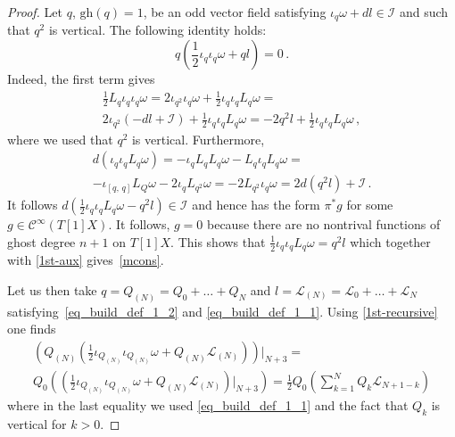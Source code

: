 \documentclass[10pt,a4paper]{amsart}
\def\cI{\mathcal{I}}
\def\cL{\mathcal{L}}
\newcommand{\cC}{\mathcal{C}}
\newcommand{\commut}[2]{[#1{,}\,#2]}
\newcommand{\gh}[1]{\mathrm{gh}(#1)}
\newcommand{\hhalf}{\frac{1}{2}}
\newcommand{\h}{\cL}
\begin{document}
\begin{proof}
Let $q$, $\gh{q}=1$, be an odd vector field satisfying $\iota_q \omega+d l\in\cI$ and such that $q^2$ is vertical. The following identity holds:
\begin{equation}
\label{mcons}
q(\hhalf \iota_q\iota_q\omega+ql)=0\,.
\end{equation}
Indeed, the first term gives
\begin{multline}
\label{1st-aux}
\hhalf L_q \iota_q\iota_q \omega=2\iota_{q^2}\iota_q\omega+\hhalf \iota_q\iota_q  L_q  \omega= \\
2\iota_{q^2}(-dl+\cI)+\hhalf \iota_q\iota_q  L_q  \omega= -2q^2l +\hhalf \iota_q\iota_q  L_q  \omega\,,
\end{multline}
where we used that $q^2$ is vertical. Furthermore,
\begin{multline}
d(\iota_q\iota_qL_q\omega)=
-\iota_qL_qL_q\omega-L_q\iota_qL_q\omega=
\\
-\iota_{\commut{q}{q}}L_Q\omega-2\iota_qL_{q^2}\omega=-2 L_{q^2}\iota_q \omega =
2d (q^2 l)+\cI \,.
\end{multline}
It follows $d(\hhalf \iota_q\iota_qL_q\omega-q^2l)\in \cI$ and hence has the form $\pi^*g$ for some $g\in \cC^\infty(T[1]X)$. It follows, $g=0$ because  there are no nontrival functions of ghost degree $n+1$ on $T[1]X$. This shows that $\hhalf \iota_q\iota_qL_q\omega=q^2l$ which together with \eqref{1st-aux} gives~\eqref{mcons}.


Let us then take $q=Q_{(N)}=Q_0+\ldots+Q_N$ and
$l=\cL_{(N)}=\cL_0+\ldots+\cL_N$ satisfying~\eqref{eq_build_def_1_2} and \eqref{eq_build_def_1_1}. Using \eqref{1st-recursive} one finds
\begin{multline}
\left(Q_{(N)}\left(\frac{1}{2}\iota_{Q_{(N)}}\iota_{Q_{(N)}} \omega +Q_{(N)}\cL_{(N)}\right)\right)\Big|_{N+3}=\\
Q_0\left(\left(\frac{1}{2}\iota_{Q_{(N)}}\iota_{Q_{(N)}} \omega+Q_{(N)}\cL_{(N)}\right)\Big|_{N+3}\right)=
\hhalf Q_0 \left( \sum_{k=1}^{N} Q_k \h_{N+1-k} \right)
\end{multline}
where in the last equality we used \eqref{eq_build_def_1_1} and the fact that $Q_k$ is vertical for $k>0$.
\end{proof}
\end{document}
